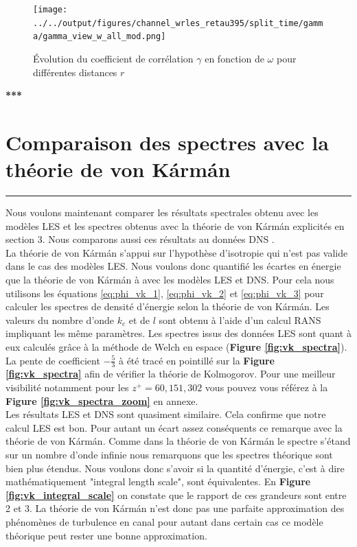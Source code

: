 \documentclass[12pt]{article}
\theoremstyle{plain}
\theoremstyle{remark}
\begin{document}
\begin{figure}[H]
	\begin{center}
		\texttt{[image: ../../output/figures/channel\_wrles\_retau395/split\_time/gamma/gamma\_view\_w\_all\_mod.png]}
		\caption{Évolution du coefficient de corrélation $\gamma$ en fonction de $\omega$ pour différentes distances $r$}
		\label{fig:gamma_w_view}
	\end{center}
\end{figure}


\begin{center}
	\large \bf{***}
\end{center}




\vspace{0.3cm}
\section{Comparaison des spectres avec la théorie de von Kármán}
\noindent\rule{\linewidth}{2pt}
\vspace{0.1cm}

Nous voulons maintenant comparer les résultats spectrales obtenu avec les modèles LES et les spectres obtenus avec la théorie de von Kármán explicités en section 3. Nous comparons aussi ces résultats au données DNS \cite{lee2015direct}. \\
La théorie de von Kármán s'appui sur l'hypothèse d'isotropie qui n'est pas valide dans le cas des modèles LES. Nous voulons donc quantifié les écartes en énergie que la théorie de von Kármán à avec les modèles LES et DNS. Pour cela nous utilisons les équations \ref{eq:phi_vk_1}, \ref{eq:phi_vk_2} et \ref{eq:phi_vk_3} pour calculer les spectres de densité d'énergie selon la théorie de von Kármán. Les valeurs du nombre d'onde $k_c$ et de $l$ sont obtenu à l'aide d'un calcul RANS impliquant les même paramètres. Les spectres issus des données LES sont quant à eux calculés grâce à la méthode de Welch en espace ({\bf Figure \ref{fig:vk_spectra}}). La pente de coefficient $-\frac{5}{3}$ à été tracé en pointillé sur la {\bf Figure \ref{fig:vk_spectra}} afin de vérifier la théorie de Kolmogorov. Pour une meilleur visibilité notamment pour les $z^+=60, 151, 302$ vous pouvez vous référez à la {\bf Figure \ref{fig:vk_spectra_zoom}} en annexe. \\

Les résultats LES et DNS sont quasiment similaire. Cela confirme que notre calcul LES est bon. Pour autant un écart assez conséquents ce remarque avec la théorie de von Kármán. Comme dans la théorie de von Kármán le spectre s'étand sur un nombre d'onde infinie nous remarquons que les spectres théorique sont bien plus étendus. Nous voulons donc s'avoir si la quantité d'énergie, c'est à dire mathématiquement "integral length scale", sont équivalentes. En {\bf Figure \ref{fig:vk_integral_scale}} on constate que le rapport de ces grandeurs sont entre 2 et 3. La théorie de von Kármán n'est donc pas une parfaite approximation des phénomènes de turbulence en canal pour autant dans certain cas ce modèle théorique peut rester une bonne approximation. 
	
\end{document}
